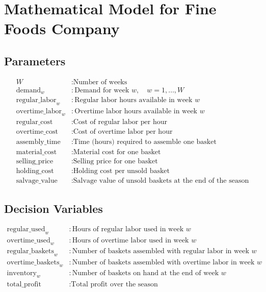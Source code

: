 \documentclass{article}
\begin{document}
\section*{Mathematical Model for Fine Foods Company}

\subsection*{Parameters}
\begin{align*}
W & : \text{Number of weeks} \\
\text{demand}_{w} & : \text{Demand for week } w, \quad w = 1, \ldots, W \\
\text{regular\_labor}_{w} & : \text{Regular labor hours available in week } w \\
\text{overtime\_labor}_{w} & : \text{Overtime labor hours available in week } w \\
\text{regular\_cost} & : \text{Cost of regular labor per hour} \\
\text{overtime\_cost} & : \text{Cost of overtime labor per hour} \\
\text{assembly\_time} & : \text{Time (hours) required to assemble one basket} \\
\text{material\_cost} & : \text{Material cost for one basket} \\
\text{selling\_price} & : \text{Selling price for one basket} \\
\text{holding\_cost} & : \text{Holding cost per unsold basket} \\
\text{salvage\_value} & : \text{Salvage value of unsold baskets at the end of the season}
\end{align*}

\subsection*{Decision Variables}
\begin{align*}
\text{regular\_used}_{w} & : \text{Hours of regular labor used in week } w \\
\text{overtime\_used}_{w} & : \text{Hours of overtime labor used in week } w \\
\text{regular\_baskets}_{w} & : \text{Number of baskets assembled with regular labor in week } w \\
\text{overtime\_baskets}_{w} & : \text{Number of baskets assembled with overtime labor in week } w \\
\text{inventory}_{w} & : \text{Number of baskets on hand at the end of week } w \\
\text{total\_profit} & : \text{Total profit over the season}
\end{align*}
\end{document}
